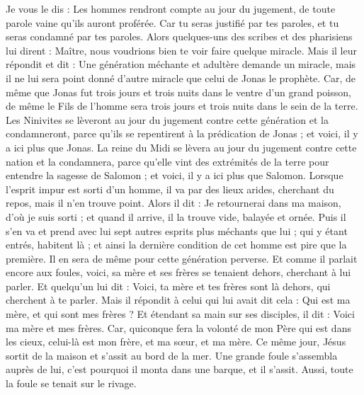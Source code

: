 \begin{multicols}{2}
Je vous le dis : Les hommes rendront compte au jour du jugement, de toute parole vaine qu'ils auront proférée.
Car tu seras justifié par tes paroles, et tu seras condamné par tes paroles.
Alors quelques-uns des scribes et des pharisiens lui dirent : Maître, nous voudrions bien te voir faire quelque miracle.
Mais il leur répondit et dit : Une génération méchante et adultère demande un miracle, mais il ne lui sera point donné d'autre miracle que celui de Jonas le prophète.
Car, de même que Jonas fut trois jours et trois nuits dans le ventre d'un grand poisson, de même le Fils de l'homme sera trois jours et trois nuits dans le sein de la terre.
Les Ninivites se lèveront au jour du jugement contre cette génération et la condamneront, parce qu'ils se repentirent à la prédication de Jonas ; et voici, il y a ici plus que Jonas.
La reine du Midi se lèvera au jour du jugement contre cette nation et la condamnera, parce qu'elle vint des extrémités de la terre pour entendre la sagesse de Salomon ; et voici, il y a ici plus que Salomon.
Lorsque l'esprit impur est sorti d'un homme, il va par des lieux arides, cherchant du repos, mais il n'en trouve point.
Alors il dit : Je retournerai dans ma maison, d'où je suis sorti ; et quand il arrive, il la trouve vide, balayée et ornée.
Puis il s'en va et prend avec lui sept autres esprits plus méchants que lui ; qui y étant entrés, habitent là ; et ainsi la dernière condition de cet homme est pire que la première. Il en sera de même pour cette génération perverse.
Et comme il parlait encore aux foules, voici, sa mère et ses frères se tenaient dehors, cherchant à lui parler.
Et quelqu'un lui dit : Voici, ta mère et tes frères sont là dehors, qui cherchent à te parler.
Mais il répondit à celui qui lui avait dit cela : Qui est ma mère, et qui sont mes frères ?
Et étendant sa main sur ses disciples, il dit : Voici ma mère et mes frères.
Car, quiconque fera la volonté de mon Père qui est dans les cieux, celui-là est mon frère, et ma sœur, et ma mère.
\VerseOne{}Ce même jour, Jésus sortit de la maison et s'assit au bord de la mer.
Une grande foule s'assembla auprès de lui, c'est pourquoi il monta dans une barque, et il s'assit. Aussi, toute la foule se tenait sur le rivage.

\end{multicols}
